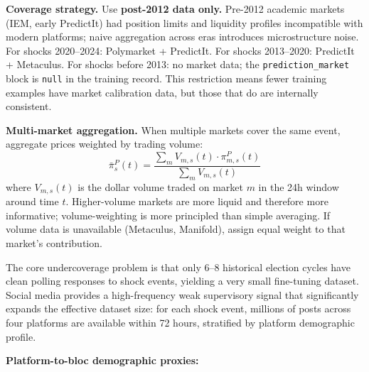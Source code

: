 \documentclass[11pt]{article}
\begin{document}
\medskip
\noindent\textbf{Coverage strategy.} Use \textbf{post-2012 data only.} Pre-2012
academic markets (IEM, early PredictIt) had position limits and liquidity profiles
incompatible with modern platforms; naive aggregation across eras introduces
microstructure noise. For shocks 2020--2024: Polymarket + PredictIt. For shocks
2013--2020: PredictIt + Metaculus. For shocks before 2013: no market data;
the \texttt{prediction\_market} block is \texttt{null} in the training record.
This restriction means fewer training examples have market calibration data, but
those that do are internally consistent.

\medskip
\noindent\textbf{Multi-market aggregation.} When multiple markets cover the same
event, aggregate prices weighted by trading volume:
\[
  \bar{\pi}^{P}_{s}(t) = \frac{\sum_m V_{m,s}(t) \cdot \pi^{P}_{m,s}(t)}
                               {\sum_m V_{m,s}(t)}
\]
where $V_{m,s}(t)$ is the dollar volume traded on market $m$ in the 24h window
around time $t$. Higher-volume markets are more liquid and therefore more
informative; volume-weighting is more principled than simple averaging.
If volume data is unavailable (Metaculus, Manifold), assign equal weight to
that market's contribution.

The core undercoverage problem is that only 6--8 historical election cycles have clean
polling responses to shock events, yielding a very small fine-tuning dataset. Social media
provides a high-frequency weak supervisory signal that significantly expands the effective
dataset size: for each shock event, millions of posts across four platforms are available
within 72 hours, stratified by platform demographic profile.

\medskip
\noindent\textbf{Platform-to-bloc demographic proxies:}
\end{document}
